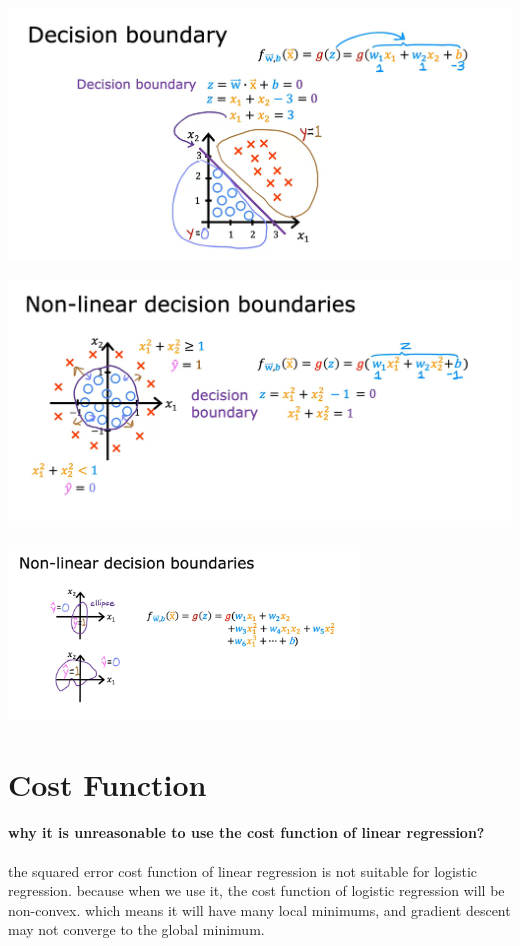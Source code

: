\begin{minipage}{0.5\textwidth}
    \includegraphics[width=\textwidth]{images/6.1_3 (2)}
\end{minipage}
\begin{minipage}{0.5\textwidth}
    \includegraphics[width=\textwidth]{images/6.1_3 (1)}
\end{minipage}
\vspace{2em}
\begin{center}
\includegraphics[width=0.7\textwidth]{images/6.1_3 (3)}
\end{center}
\newpage

\section{Cost Function}
\paragraph*{why it is unreasonable to use the cost function of linear regression?}\leavevmode \par
\hspace{2em}the squared error cost function of linear regression is not suitable for logistic regression.
because when we use it, the cost function of logistic regression will be non-convex.
which means it will have many local minimums, and gradient descent may not converge to the global minimum.\par

